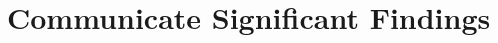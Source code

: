 \documentclass[9pt,twocolumn,twoside]{gsag3jnl}
\begin{document}


\section*{Communicate Significant Findings}
\end{document}
